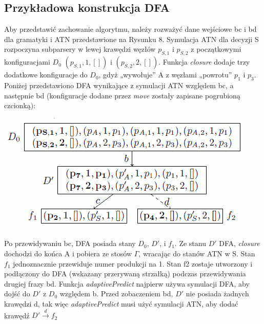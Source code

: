 ﻿\subsection{Przykładowa konstrukcja DFA}
Aby przedstawić zachowanie algorytmu, należy rozważyć dane wejściowe bc i bd dla gramatyki
i ATN przedstawione na Rysunku 8.
Symulacja ATN dla decyzji S rozpoczyna subparsery w lewej krawędzi węzłów $p_{S,1}$ i $p_{S,2}$
z początkowymi konfiguracjami $D_0$ $(p_{S,1}, 1, [])$ i $(p_{S,2}, 2, [])$.
Funkcja \textit{closure} dodaje trzy dodatkowe konfiguracje do $D_0$, gdyż „wywołuje” A
z węzłami „powrotu” $p_1$ i $p_3$.
Poniżej przedstawiono DFA wynikające z symulacji ATN względem bc, a następnie bd
(konfiguracje dodane przez \textit{move} zostały zapisane pogrubioną czcionką):
\par
\includegraphics[scale=0.5]{5_4}
\par
Po przewidywaniu bc, DFA posiada stany $D_0$, $D'$, i $f_1$. Ze stanu $D'$ DFA,
\textit{closure} dochodzi do końca A i pobiera ze stosów $\Gamma$, wracając do stanów ATN w S.
Stan $f_1$ jednoznacznie przewiduje numer produkcji na 1. Stan f2 zostaje utworzony i podłączony do DFA
(wskazany przerywaną strzałką) podczas przewidywania drugiej frazy bd.
Funkcja \textit{adaptivePredict} najpierw używa symulacji DFA, aby dojść do $D'$ z $D_0$ względem b.
Przed zobaczeniem bd, $D'$ nie posiada żadnych krawędzi d, tak więc \textit{adaptivePredict}
musi użyć symulacji ATN, aby dodać krawędź $D' \overset{d}{\rightarrow}f_2$

